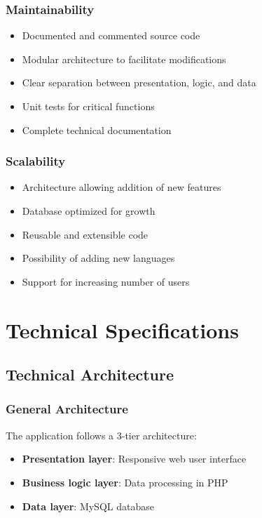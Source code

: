 \documentclass[12pt,a4paper]{report}
\begin{document}
\subsection{Maintainability}
\begin{itemize}
    \item Documented and commented source code
    \item Modular architecture to facilitate modifications
    \item Clear separation between presentation, logic, and data
    \item Unit tests for critical functions
    \item Complete technical documentation
\end{itemize}

\subsection{Scalability}
\begin{itemize}
    \item Architecture allowing addition of new features
    \item Database optimized for growth
    \item Reusable and extensible code
    \item Possibility of adding new languages
    \item Support for increasing number of users
\end{itemize}

\chapter{Technical Specifications}

\section{Technical Architecture}

\subsection{General Architecture}
The application follows a 3-tier architecture:
\begin{itemize}
    \item \textbf{Presentation layer}: Responsive web user interface
    \item \textbf{Business logic layer}: Data processing in PHP
    \item \textbf{Data layer}: MySQL database
\end{itemize}
\end{document}
